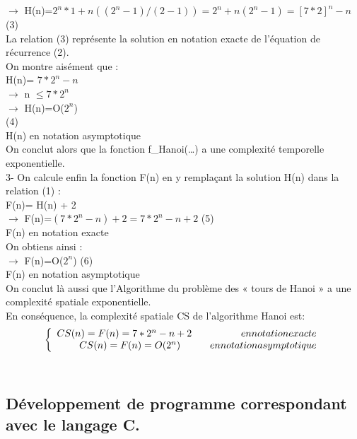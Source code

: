 \documentclass[12pt]{article}
\begin{document}
$\rightarrow$ H(n)=$2^n*1+n((2^n-1)/(2-1))=2^n+n(2^n-1)= [7*2]^n-n	$		(3)\\
La relation (3) représente la solution en notation exacte de l'équation de récurrence (2).\\

On montre aisément que :\\
H(n)= $7*2^n-n$       \\
$\rightarrow$ n $\le 7*2^n $\\
$\rightarrow$ H(n)=O($2^n$)       \\          							(4)\\
H(n) en notation asymptotique\\

On conclut alors que la fonction f\_Hanoi(…) a une complexité temporelle exponentielle.\\

3- On calcule enfin la fonction F(n) en y remplaçant la solution H(n) dans la relation (1) :\\
F(n)= H(n) + 2\\
$\rightarrow$ F(n)=$(7*2^n-n)+2= 7*2^n-n+2$         					(5)\\
F(n) en notation exacte\\

On obtiens ainsi :\\
$\rightarrow$ F(n)=O($2^n$)                 							(6)\\
F(n) en notation asymptotique\\

On conclut là aussi que l'Algorithme du problème des « tours de Hanoi » a une complexité spatiale exponentielle.\\

En conséquence, la complexité spatiale CS de l'algorithme Hanoi est: \\

  \[ 
\left\{
\begin{array}{r c l}
CS(n)=F(n)=7*2^n-n+2 \quad \quad \quad \quad \quad en notation exacte\\
CS(n)=F(n)= O(2^n)\quad \quad \quad en notation asymptotique
\end{array}
\right.
\]
\\



\subsection{Développement de programme correspondant avec le langage C.}
\end{document}
